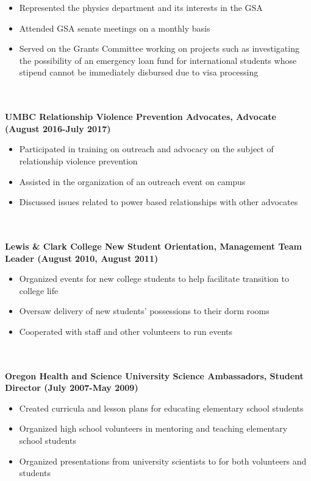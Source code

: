 \documentclass{article}
\begin{document}
\begin{itemize}
\item Represented the physics department and its interests in the GSA
\item Attended GSA senate meetings on a monthly basis
\item Served on the Grants Committee working on projects such as investigating the possibility of an emergency loan fund for international students whose stipend cannot be immediately disbursed due to visa processing
\end{itemize}
\phantom \\
\phantom \\
%
%
%
%
\noindent \textbf{UMBC Relationship Violence Prevention Advocates, Advocate (August 2016-July 2017)}
\phantom \\
\begin{itemize}
\item Participated in training on outreach and advocacy on the subject of relationship violence prevention
\item Assisted in the organization of an outreach event on campus
\item Discussed issues related to power based relationships with other advocates
\end{itemize}
\phantom \\
\phantom \\
%
%
%
%
\noindent \textbf{Lewis \& Clark College New Student Orientation, Management Team Leader (August 2010, August 2011)}
\phantom \\
\begin{itemize}
\item Organized events for new college students to help facilitate transition to college life
\item Oversaw delivery of new students’ possessions to their dorm rooms
\item Cooperated with staff and other volunteers to run events
\end{itemize}
\phantom \\
\phantom \\
%
%
%
%
\noindent \textbf{Oregon Health and Science University Science Ambassadors, Student Director (July 2007-May 2009)}
\phantom \\
\begin{itemize}
\item Created curricula and lesson plans for educating elementary school students
\item Organized high school volunteers in mentoring and teaching elementary school students
\item Organized presentations from university scientists to for both volunteers and students
\end{itemize}
\end{document}
